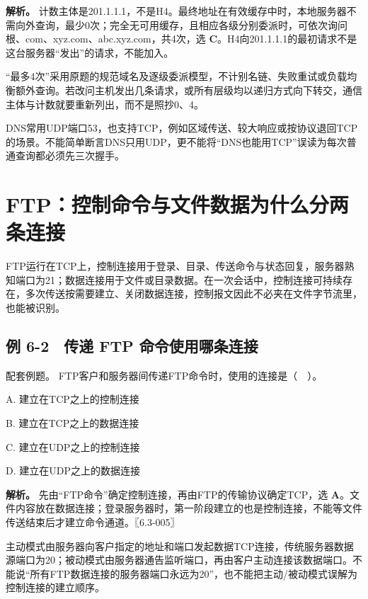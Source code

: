 \textbf{解析。} 计数主体是201.1.1.1，不是H4。最终地址在有效缓存中时，本地服务器不需向外查询，最少0次；完全无可用缓存，且相应各级分别委派时，可依次询问根、com、xyz.com、abc.xyz.com，共4次，选 \textbf{C}。H4向201.1.1.1的最初请求不是这台服务器``发出''的请求，不能加入。

``最多4次''采用原题的规范域名及逐级委派模型，不计别名链、失败重试或负载均衡额外查询。若改问主机发出几条请求，或所有层级均以递归方式向下转交，通信主体与计数就要重新列出，而不是照抄0、4。

DNS常用UDP端口53，也支持TCP，例如区域传送、较大响应或按协议退回TCP的场景。不能简单断言DNS只用UDP，更不能将``DNS也能用TCP''误读为每次普通查询都必须先三次握手。

\section{FTP：控制命令与文件数据为什么分两条连接}\label{CN06-04}

FTP运行在TCP上，控制连接用于登录、目录、传送命令与状态回复，服务器熟知端口为21；数据连接用于文件或目录数据。在一次会话中，控制连接可持续存在，多次传送按需要建立、关闭数据连接，控制报文因此不必夹在文件字节流里，也能被识别。

\subsection{例 6-2　传递 FTP 命令使用哪条连接}\label{CN06-ex2}

\begin{example}[配套例题]

配套例题。 FTP客户和服务器间传递FTP命令时，使用的连接是（　）。

A. 建立在TCP之上的控制连接

B. 建立在TCP之上的数据连接

C. 建立在UDP之上的控制连接

D. 建立在UDP之上的数据连接

\end{example}

\textbf{解析。} 先由``FTP命令''确定控制连接，再由FTP的传输协议确定TCP，选 \textbf{A}。文件内容放在数据连接；登录服务器时，第一阶段建立的也是控制连接，不能等文件传送结束后才建立命令通道。〖6.3-005〗

主动模式由服务器向客户指定的地址和端口发起数据TCP连接，传统服务器数据源端口为20；被动模式由服务器通告监听端口，再由客户主动连接该数据端口。不能说``所有FTP数据连接的服务器端口永远为20''，也不能把主动/被动模式误解为控制连接的建立顺序。

